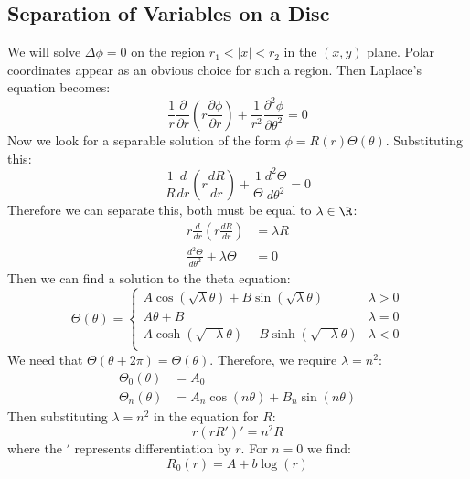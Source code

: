 \documentclass[../Main.tex]{subfiles}
\begin{document}
\subsection{Separation of Variables on a Disc}
We will solve $\Delta \phi = 0$ on the region $r_1 < |x| < r_2$ in the $(x, y)$ plane. Polar coordinates appear as an obvious choice for such a region. Then Laplace's equation becomes:
\begin{equation*}
    \frac{1}{r} \frac{\partial }{\partial r} \left(r \frac{\partial \phi}{\partial r}\right) + \frac{1}{r^2} \frac{\partial^{2}\phi}{\partial \theta^{2}} = 0
\end{equation*}
Now we look for a separable solution of the form $\phi = R(r) \Theta(\theta)$. Substituting this:
\begin{equation}
    \frac{1}{R}\frac{d}{dr}\left(r \frac{dR}{dr}\right) + \frac{1}{\Theta} \frac{d^{2}\Theta}{d\theta^{2}} = 0
    \label{eqnDiscSeparated}
\end{equation}
Therefore we can separate this, both must be equal to $\lambda \in \R$:
\begin{align*}
    r \frac{d}{dr}\left(r \frac{dR}{dr}\right) &= \lambda R \\
    \frac{d^{2}\Theta}{d\theta^{2}} + \lambda \Theta &= 0
\end{align*}
Then we can find a solution to the theta equation:
\begin{equation*}
    \Theta(\theta) =
    \begin{cases}
        A \cos(\sqrt{\lambda}\theta) + B\sin(\sqrt{\lambda} \theta) & \lambda > 0 \\
        A\theta + B & \lambda = 0 \\
        A \cosh(\sqrt{-\lambda}\theta) + B\sinh(\sqrt{-\lambda} \theta) & \lambda < 0 \\
    \end{cases}
\end{equation*}
We need that $\Theta(\theta + 2\pi) = \Theta(\theta)$. Therefore, we require $\lambda = n^2$:
\begin{align*}
    \Theta_0 (\theta) &= A_0 \\
    \Theta_n(\theta) &= A_n \cos(n\theta) + B_n \sin(n\theta)
\end{align*}
Then substituting $\lambda = n^2$ in the equation for $R$:
\begin{equation*}
    r(rR')' = n^2 R
\end{equation*}
where the $'$ represents differentiation by $r$. For $n = 0$ we find:
\begin{equation*}
    R_0(r) = A + b\log(r)
\end{equation*}
\end{document}
